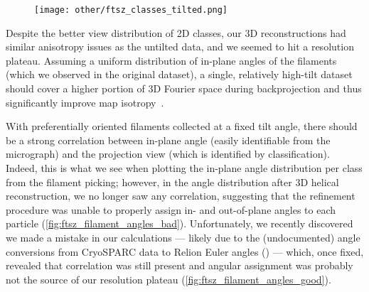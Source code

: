 \begin{figure}[ht]
    \centering
    \texttt{[image: other/ftsz\_classes\_tilted.png]}
    \label{fig:ftsz_classes_tilted}
\end{figure}

Despite the better view distribution of 2D classes, our 3D reconstructions had similar anisotropy issues as the untilted data, and we seemed to hit a resolution plateau.
Assuming a uniform distribution of in-plane angles of the filaments (which we observed in the original dataset), a single, relatively high-tilt dataset should cover a higher portion of 3D Fourier space during backprojection and thus significantly improve map isotropy~\cite{tanAddressingPreferredSpecimen2017}.

With preferentially oriented filaments collected at a fixed tilt angle, there should be a strong correlation between in-plane angle (easily identifiable from the micrograph) and the projection view (which is identified by classification).
Indeed, this is what we see when plotting the in-plane angle distribution per class from the filament picking;
however, in the angle distribution after 3D helical reconstruction, we no longer saw any correlation, suggesting that the refinement procedure was unable to properly assign in- and out-of-plane angles to each particle (\autoref{fig:ftsz_filament_angles_bad}).
Unfortunately, we recently discovered we made a mistake in our calculations --- likely due to the (undocumented) angle conversions from CryoSPARC data to Relion Euler angles () --- which, once fixed, revealed that correlation was still present and angular assignment was probably not the source of our resolution plateau (\autoref{fig:ftsz_filament_angles_good}).

